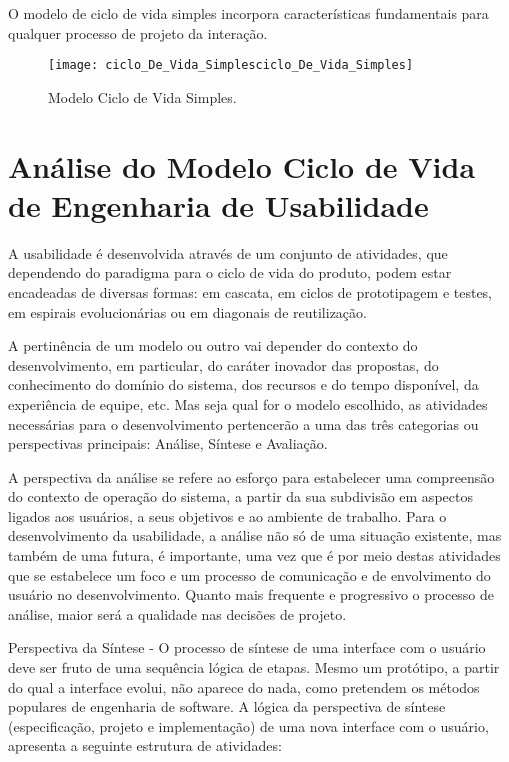 		O modelo de ciclo de vida simples incorpora características fundamentais para qualquer processo de projeto da interação.

		\begin{figure}[h]
			\centering
			\texttt{[image: ciclo\_De\_Vida\_Simplesciclo\_De\_Vida\_Simples]}
			\caption[Modelo Ciclo de Vida Simples]{Modelo Ciclo de Vida Simples. \cite{designEInteracao}}
			\label{fig:ciclo_De_Vida_Simplesciclo_De_Vida_Simples}
		\end{figure}

	\newpage
	
	\section[Análise do Modelo Ciclo de Vida de Engenharia de Usabilidade]{Análise do Modelo Ciclo de Vida de Engenharia de Usabilidade}
	\label{sec:cicloDeVida_EU}
		A usabilidade é desenvolvida através de um conjunto de atividades, que dependendo do paradigma para o ciclo de vida do produto, podem estar encadeadas de diversas formas: em cascata, em ciclos de prototipagem e testes, em espirais evolucionárias ou em diagonais de reutilização. \cite{designEInteracao}

		A pertinência de um modelo ou outro vai depender do contexto do desenvolvimento, em particular, do caráter inovador das propostas, do conhecimento do domínio do sistema, dos recursos e do tempo disponível, da experiência de equipe, etc. Mas seja qual for o modelo escolhido, as atividades necessárias para o desenvolvimento pertencerão a uma das três categorias ou perspectivas principais: Análise, Síntese e Avaliação.

		A perspectiva da análise se refere ao esforço para estabelecer uma compreensão do contexto de operação do sistema, a partir da sua subdivisão em aspectos ligados aos usuários, a seus objetivos e ao ambiente de trabalho. Para o desenvolvimento da usabilidade, a análise não só de uma situação existente, mas também de uma futura, é importante, uma vez que é por meio destas atividades que se estabelece um foco e um processo de comunicação e de envolvimento do usuário no desenvolvimento. Quanto mais frequente e progressivo o processo de análise, maior será a qualidade nas decisões de projeto.

		Perspectiva da Síntese - O processo de síntese de uma interface com o usuário deve ser fruto de uma sequência lógica de etapas. Mesmo um protótipo, a partir do qual a interface evolui, não aparece do nada, como pretendem os métodos populares de engenharia de software. A lógica da perspectiva de síntese (especificação, projeto e implementação) de uma nova interface com o usuário, apresenta a seguinte estrutura de atividades:

